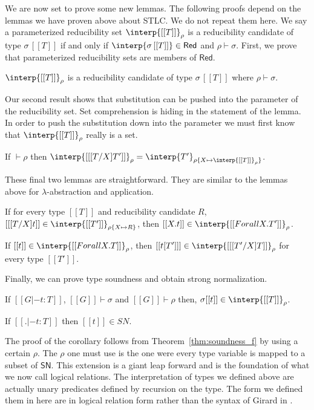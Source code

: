 We are now set to prove some new lemmas.  The following proofs depend
on the lemmas we have proven above about STLC.  We do not repeat them
here.  We say a parameterized reducibility set $\interp{[[T]]}_\rho$
is a reducibility candidate of type $\sigma\,[[T]]$ if and only if
$\interp{\sigma\,[[T]]} \in \mathsf{Red}$ and $\rho \vdash \sigma$.
First, we prove that parameterized reducibility sets are
members of $\mathsf{Red}$.

\begin{lemma}
  \label{lemma:sn_f_cand}
  $\interp{[[T]]}_\rho$ is a reducibility candidate of type $\sigma\,[[T]]$ 
  where $\rho \vdash \sigma$.
\end{lemma}
\noindent
Our second result shows that substitution can be pushed into the
parameter of the reducibility set.  Set comprehension is hiding in
the statement of the lemma.  In order to push the substitution down into
the parameter we must first know that $\interp{[[T]]}_\rho$ really is
a set.
\begin{lemma}
  \label{lemma:red_subst}
  If $\vdash \rho$ then $\interp{[[ [T/X]T']]}_\rho = \interp{T'}_{\rho\{ X \mapsto \interp{[[T]]}_\rho\}}$.
\end{lemma}
\noindent
These final two lemmas are straightforward.  They are similar to the
lemmas above for $\lambda$-abstraction and application.
\begin{lemma}
  \label{lemma:red_f_univ_abs}
  If for every type $[[T]]$ and reducibility candidate $R$, $[[ [T/X]t]] \in \interp{[[T']]}_{\rho\{X \mapsto R\}}$, then
  $[[\\ X.t]] \in \interp{[[Forall X.T']]}_\rho$.
\end{lemma}

\begin{lemma}
  \label{lemma:red_f_univ_app}
  If $[[t]] \in \interp{[[Forall X.T]]}_\rho$, then $[[t [T'] ]] \in \interp{[[ [T'/X]T]]}_\rho$ for every type $[[T']]$.
\end{lemma}
\noindent
Finally, we can prove type soundness and obtain strong normalization.
\begin{thm}
  \label{thm:soundness_f}
  If $[[G |- t : T]]$, $[[G]] \vdash \sigma$ and $[[G]] \vdash \rho$ then,
  $\sigma [[t]] \in \interp{[[T]]}_{\rho}$.
\end{thm}

\begin{corollary}
  \label{corollary:sn_f}
  If $[[. |- t : T]]$ then $[[t]] \in SN$.
\end{corollary}
\noindent
The proof of the corollary follows from Theorem~\ref{thm:soundness_f}
by using a certain $\rho$.  The $\rho$ one must use is the one were
every type variable is mapped to a subset of $\mathsf{SN}$.  This
extension is a giant leap forward and is the foundation of what we now
call logical relations.  The interpretation of types we defined above
are actually unary predicates defined by recursion on the type.  The
form we defined them in here are in logical relation form rather than
the syntax of Girard in \cite{Girard:1989}.
